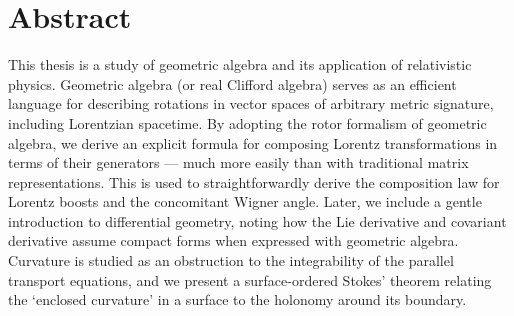 \chapter*{Abstract}

This thesis is a study of geometric algebra and its application of relativistic physics.
Geometric algebra (or real Clifford algebra) serves as an efficient language for describing rotations in vector spaces of arbitrary metric signature, including Lorentzian spacetime.
By adopting the rotor formalism of geometric algebra, we derive an explicit  formula for composing Lorentz transformations in terms of their generators --- much more easily than with traditional matrix representations.
This is used to straightforwardly derive the composition law for Lorentz boosts and the concomitant Wigner angle.
Later, we include a gentle introduction to differential geometry, noting how the Lie derivative and covariant derivative assume compact forms when expressed with geometric algebra.
Curvature is studied as an obstruction to the integrability of the parallel transport equations, and we present a surface-ordered Stokes' theorem relating the `enclosed curvature' in a surface to the holonomy around its boundary.